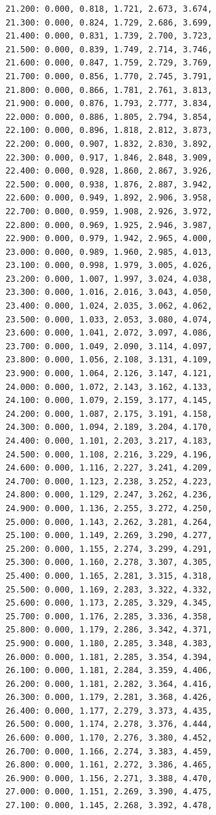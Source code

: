 \documentclass[12pt, a4paper]{article}
\begin{document}
\begin{scriptsize}
\begin{ttfamily}
\begin{lstlisting}
21.200: 0.000, 0.818, 1.721, 2.673, 3.674, 
21.300: 0.000, 0.824, 1.729, 2.686, 3.699, 
21.400: 0.000, 0.831, 1.739, 2.700, 3.723, 
21.500: 0.000, 0.839, 1.749, 2.714, 3.746, 
21.600: 0.000, 0.847, 1.759, 2.729, 3.769, 
21.700: 0.000, 0.856, 1.770, 2.745, 3.791, 
21.800: 0.000, 0.866, 1.781, 2.761, 3.813, 
21.900: 0.000, 0.876, 1.793, 2.777, 3.834, 
22.000: 0.000, 0.886, 1.805, 2.794, 3.854, 
22.100: 0.000, 0.896, 1.818, 2.812, 3.873, 
22.200: 0.000, 0.907, 1.832, 2.830, 3.892, 
22.300: 0.000, 0.917, 1.846, 2.848, 3.909, 
22.400: 0.000, 0.928, 1.860, 2.867, 3.926, 
22.500: 0.000, 0.938, 1.876, 2.887, 3.942, 
22.600: 0.000, 0.949, 1.892, 2.906, 3.958, 
22.700: 0.000, 0.959, 1.908, 2.926, 3.972, 
22.800: 0.000, 0.969, 1.925, 2.946, 3.987, 
22.900: 0.000, 0.979, 1.942, 2.965, 4.000, 
23.000: 0.000, 0.989, 1.960, 2.985, 4.013, 
23.100: 0.000, 0.998, 1.979, 3.005, 4.026, 
23.200: 0.000, 1.007, 1.997, 3.024, 4.038, 
23.300: 0.000, 1.016, 2.016, 3.043, 4.050, 
23.400: 0.000, 1.024, 2.035, 3.062, 4.062, 
23.500: 0.000, 1.033, 2.053, 3.080, 4.074, 
23.600: 0.000, 1.041, 2.072, 3.097, 4.086, 
23.700: 0.000, 1.049, 2.090, 3.114, 4.097, 
23.800: 0.000, 1.056, 2.108, 3.131, 4.109, 
23.900: 0.000, 1.064, 2.126, 3.147, 4.121, 
24.000: 0.000, 1.072, 2.143, 3.162, 4.133, 
24.100: 0.000, 1.079, 2.159, 3.177, 4.145, 
24.200: 0.000, 1.087, 2.175, 3.191, 4.158, 
24.300: 0.000, 1.094, 2.189, 3.204, 4.170, 
24.400: 0.000, 1.101, 2.203, 3.217, 4.183, 
24.500: 0.000, 1.108, 2.216, 3.229, 4.196, 
24.600: 0.000, 1.116, 2.227, 3.241, 4.209, 
24.700: 0.000, 1.123, 2.238, 3.252, 4.223, 
24.800: 0.000, 1.129, 2.247, 3.262, 4.236, 
24.900: 0.000, 1.136, 2.255, 3.272, 4.250, 
25.000: 0.000, 1.143, 2.262, 3.281, 4.264, 
25.100: 0.000, 1.149, 2.269, 3.290, 4.277, 
25.200: 0.000, 1.155, 2.274, 3.299, 4.291, 
25.300: 0.000, 1.160, 2.278, 3.307, 4.305, 
25.400: 0.000, 1.165, 2.281, 3.315, 4.318, 
25.500: 0.000, 1.169, 2.283, 3.322, 4.332, 
25.600: 0.000, 1.173, 2.285, 3.329, 4.345, 
25.700: 0.000, 1.176, 2.285, 3.336, 4.358, 
25.800: 0.000, 1.179, 2.286, 3.342, 4.371, 
25.900: 0.000, 1.180, 2.285, 3.348, 4.383, 
26.000: 0.000, 1.181, 2.285, 3.354, 4.394, 
26.100: 0.000, 1.181, 2.284, 3.359, 4.406, 
26.200: 0.000, 1.181, 2.282, 3.364, 4.416, 
26.300: 0.000, 1.179, 2.281, 3.368, 4.426, 
26.400: 0.000, 1.177, 2.279, 3.373, 4.435, 
26.500: 0.000, 1.174, 2.278, 3.376, 4.444, 
26.600: 0.000, 1.170, 2.276, 3.380, 4.452, 
26.700: 0.000, 1.166, 2.274, 3.383, 4.459, 
26.800: 0.000, 1.161, 2.272, 3.386, 4.465, 
26.900: 0.000, 1.156, 2.271, 3.388, 4.470, 
27.000: 0.000, 1.151, 2.269, 3.390, 4.475, 
27.100: 0.000, 1.145, 2.268, 3.392, 4.478, 

\end{lstlisting}
\end{ttfamily}
\end{scriptsize}
\end{document}

